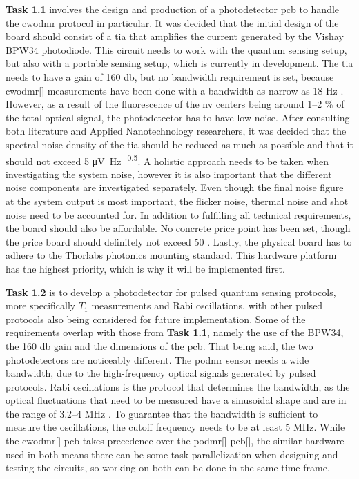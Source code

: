 \textbf{Task 1.1} involves the design and production of a photodetector \gls{pcb} to handle the \gls{cwodmr} protocol in particular. It was decided that the initial design of the board should consist of a \gls{tia} that amplifies the current generated by the Vishay BPW34 photodiode. This circuit needs to work with the quantum sensing setup, but also with a portable sensing setup, which is currently in development. The \gls{tia} needs to have a gain of 160 \unit{\decibel}, but no bandwidth requirement is set, because \gls{cwodmr}[] measurements have been done with a bandwidth as narrow as 18 \unit[]{\hertz} \cite{acharya2025compact}. However, as a result of the fluorescence of the \gls{nv} centers being around \numrange[]{1}{2} \% of the total optical signal, the photodetector has to have low noise. After consulting both literature \cite{chuprina2026impact} and Applied Nanotechnology researchers, it was decided that the spectral noise density of the \gls{tia} should be reduced as much as possible and that it should not exceed 5 \unit[power-half-as-sqrt]{\micro\volt\per\hertz\tothe{0.5}}. A holistic approach needs to be taken when investigating the system noise, however it is also important that the different noise components are investigated separately. Even though the final noise figure at the system output is most important, the flicker noise, thermal noise and shot noise need to be accounted for. In addition to fulfilling all technical requirements, the board should also be affordable. No concrete price point has been set, though the price board should definitely not exceed 50 \texteuro. Lastly, the physical board has to adhere to the Thorlabs photonics mounting standard. This hardware platform has the highest priority, which is why it will be implemented first.

\textbf{Task 1.2} is to develop a photodetector for pulsed quantum sensing protocols, more specifically $T_1$ measurements and Rabi oscillations, with other pulsed protocols also being considered for future implementation. Some of the requirements overlap with those from \textbf{Task 1.1}, namely the use of the BPW34, the 160 \unit[]{\decibel} gain and the dimensions of the \gls{pcb}. That being said, the two photodetectors are noticeably different. The \gls{podmr} sensor needs a wide bandwidth, due to the high-frequency optical signals generated by pulsed protocols. Rabi oscillations is the protocol that determines the bandwidth, as the optical fluctuations that need to be measured have a sinusoidal shape and are in the range of \numrange{3,2}{4} \unit{\mega\hertz} \cite{murzakhanov2025mechanism}. To guarantee that the bandwidth is sufficient to measure the oscillations, the cutoff frequency needs to be at least 5 \unit{\mega\hertz}. While the \gls{cwodmr}[] \gls{pcb} takes precedence over the \gls{podmr}[] \gls{pcb}[], the similar hardware used in both means there can be some task parallelization when designing and testing the circuits, so working on both can be done in the same time frame.

